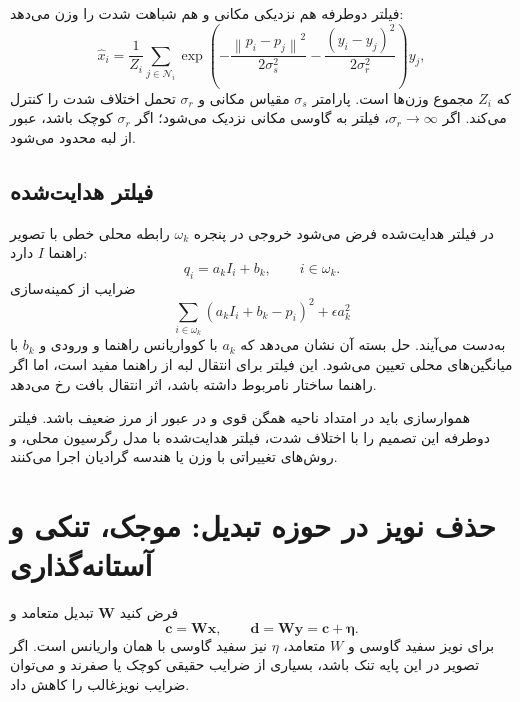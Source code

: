 \documentclass[12pt,openany,oneside]{book}
\newcommand{\norm}[1]{\left\lVert #1\right\rVert}
\newcommand{\vect}[1]{\bm{#1}}
\begin{document}
فیلتر دوطرفه هم نزدیکی مکانی و هم شباهت شدت را وزن می‌دهد:
\begin{equation}
\widehat x_i=\frac{1}{Z_i}\sum_{j\in\mathcal N_i}
\exp\!\left(-\frac{\norm{p_i-p_j}^2}{2\sigma_s^2}
-\frac{(y_i-y_j)^2}{2\sigma_r^2}\right)y_j,
\label{eq:bilateral}
\end{equation}
که \(Z_i\) مجموع وزن‌ها است. پارامتر \(\sigma_s\) مقیاس مکانی و \(\sigma_r\) تحمل اختلاف شدت را کنترل می‌کند.
اگر \(\sigma_r\to\infty\)، فیلتر به گاوسی مکانی نزدیک می‌شود؛ اگر \(\sigma_r\) کوچک باشد، عبور از لبه محدود می‌شود.

\subsection{فیلتر هدایت‌شده}

در فیلتر هدایت‌شده فرض می‌شود خروجی در پنجره \(\omega_k\) رابطه محلی خطی با تصویر راهنما \(I\) دارد:
\begin{equation}
q_i=a_k I_i+b_k,\qquad i\in\omega_k.
\end{equation}
ضرایب از کمینه‌سازی
\begin{equation}
\sum_{i\in\omega_k}(a_kI_i+b_k-p_i)^2+\epsilon a_k^2
\end{equation}
به‌دست می‌آیند. حل بسته آن نشان می‌دهد که \(a_k\) با کوواریانس راهنما و ورودی و \(b_k\) با میانگین‌های محلی تعیین می‌شود.
این فیلتر برای انتقال لبه از راهنما مفید است، اما اگر راهنما ساختار نامربوط داشته باشد، اثر انتقال بافت رخ می‌دهد.

\begin{keybox}
هموارسازی باید در امتداد ناحیه همگن قوی و در عبور از مرز ضعیف باشد. فیلتر دوطرفه این تصمیم را با اختلاف شدت،
فیلتر هدایت‌شده با مدل رگرسیون محلی، و روش‌های تغییراتی با وزن یا هندسه گرادیان اجرا می‌کنند.
\end{keybox}

\section{حذف نویز در حوزه تبدیل: موجک، تنکی و آستانه‌گذاری}

فرض کنید \(\vect W\) تبدیل متعامد و
\begin{equation}
\vect c=\vect W\vect x,
\qquad
\vect d=\vect W\vect y=\vect c+\vect\eta.
\end{equation}
برای نویز سفید گاوسی و \(W\) متعامد، \(\eta\) نیز سفید گاوسی با همان واریانس است. اگر تصویر در این پایه تنک باشد،
بسیاری از ضرایب حقیقی کوچک یا صفرند و می‌توان ضرایب نویزغالب را کاهش داد.
\end{document}
